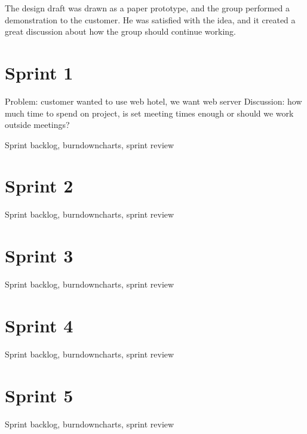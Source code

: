 The design draft was drawn as a paper prototype, and the group performed a demonstration to the customer. He was satisfied with the idea, and it created a great discussion about how the group should continue working. 


\section{Sprint 1}
Problem: customer wanted to use web hotel, we want web server
Discussion: how much time to spend on project, is set meeting times enough or should we work outside meetings?

Sprint backlog, burndowncharts, sprint review

\section{Sprint 2}
Sprint backlog, burndowncharts, sprint review

\section{Sprint 3}
Sprint backlog, burndowncharts, sprint review

\section{Sprint 4}
Sprint backlog, burndowncharts, sprint review

\section{Sprint 5}
Sprint backlog, burndowncharts, sprint review

\cleardoublepage